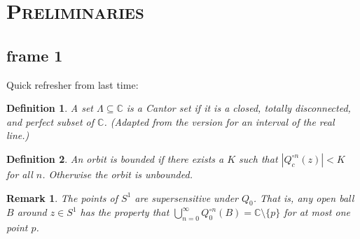 \documentclass[xcolor=x11names,compress]{beamer}
\renewcommand{\(}{\begin{columns}}
\renewcommand{\)}{\end{columns}}
\newcommand{\<}[1]{\begin{column}{#1}}
\renewcommand{\>}{\end{column}}
\newtheorem{defn}{Definition}
\newtheorem{rmk}{Remark}
\begin{document}
\section{\scshape Preliminaries}
\subsection{frame 1}
\begin{frame}
Quick refresher from last time:
\pause
\begin{defn}
A set $\Lambda \subseteq \mathbb{C}$ is a Cantor set if it is a closed, totally disconnected, and perfect subset of $\mathbb{C}$. (Adapted from the version for an interval of the real line.)
\end{defn}
\pause
\begin{defn}
An orbit is \textsl{bounded} if there exists a $K$ such that $|Q_c^{\circ n}(z)| < K$ for all $n$. Otherwise the orbit is \textsl{unbounded}.
\end{defn}
\pause
\begin{rmk}
The points of $S^1$ are \textsl{supersensitive} under $Q_{0}$. That is, any open ball $B$ around $z \in S^1$ has the property that $\bigcup_{n=0}^\infty Q_0^{\circ n} (B) = \mathbb{C} \setminus \{p\}$ for at most one point $p$.
\end{rmk}
\end{frame}
\end{document}
